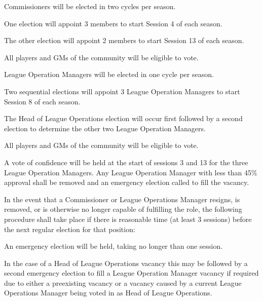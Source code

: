 \begin{deepEnumerate}
\begin{deepEnumerate}
	\end{deepEnumerate}
	\item Commissioners will be elected in two cycles per season.
	\begin{deepEnumerate}
		\item One election will appoint 3 members to start Session 4 of each season.
		\item The other election will appoint 2 members to start Session 13 of each season.
		\item All players and GMs of the community will be eligible to vote.
	\end{deepEnumerate}
	\item League Operation Managers will be elected in one cycle per season.
	\begin{deepEnumerate}
		\item Two sequential elections will appoint 3 League Operation Managers to start Session 8 of each season.
		\begin{deepEnumerate}
			\item The Head of League Operations election will occur first followed by a second election to determine the other two League Operation Managers.
		\end{deepEnumerate}
		\item All players and GMs of the community will be eligible to vote.
		\item A vote of confidence will be held at the start of sessions 3 and 13 for the three League Operation Managers. Any League Operation Manager with less than
		 45\% approval shall be removed and an emergency election called to fill the vacancy.
	\end{deepEnumerate}
	\item In the event that a Commissioner or League Operations Manager resigns, is removed, or is otherwise no longer capable of fulfilling the role, the following
	procedure shall take place if there is reasonable time (at least 3 sessions) before the next regular election for that position:
	\begin{deepEnumerate}
		\item An emergency election will be held, taking no longer than one session.
		\begin{deepEnumerate}
			\item In the case of a Head of League Operations vacancy this may be followed by a second emergency election to fill a League Operation Manager vacancy
			if required due to either a preexisting vacancy or a vacancy caused by a current League Operations Manager being voted in as Head of League Operations.

\end{deepEnumerate}
\end{deepEnumerate}
\end{deepEnumerate}
